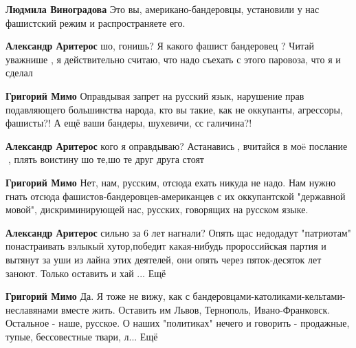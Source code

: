 \begin{itemize}
\begin{itemize}

\textbf{Людмила Виноградова} Это вы, американо-бандеровцы, установили у нас фашистский режим и распространяете его.


\textbf{Александр Аритерос} шо, гонишь? Я какого фашист бандеровец ? Читай уважнише , я действительно считаю, что надо съехать с этого паровоза, что я и сделал


\textbf{Григорий Мимо} Оправдывая запрет на русский язык, нарушение прав подавляющего большинства народа, кто вы такие, как не оккупанты, агрессоры, фашисты?!
А ещё ваши бандеры, шухевичи, сс галичина?!


\textbf{Александр Аритерос} кого я оправдываю? Астанавись🤣, вчитайся в моë послание 🤣, плять воистину шо те,шо те друг друга стоят


\textbf{Григорий Мимо} Нет, нам, русским, отсюда ехать никуда не надо. Нам нужно гнать отсюда фашистов-бандеровцев-американцев с их оккупантской "державной мовой", дискриминирующей нас, русских, говорящих на русском языке.


\textbf{Александр Аритерос} сильно за 6 лет нагнали? Опять щас недодадут "патриотам" понастраивать вэлыкый хутор,победит какая-нибудь пророссийская партия и вытянут за уши из лайна этих деятелей, они опять через пяток-десяток лет заноют. Только оставить и хай ... Ещё


\textbf{Григорий Мимо} Да. Я тоже не вижу, как с бандеровцами-католиками-кельтами-неславянами вместе жить. Оставить им Львов, Тернополь, Ивано-Франковск. Остальное - наше, русское.
О наших "политиках" нечего и говорить - продажные, тупые, бессовестные твари, л... Ещё


\end{itemize}
\end{itemize}
